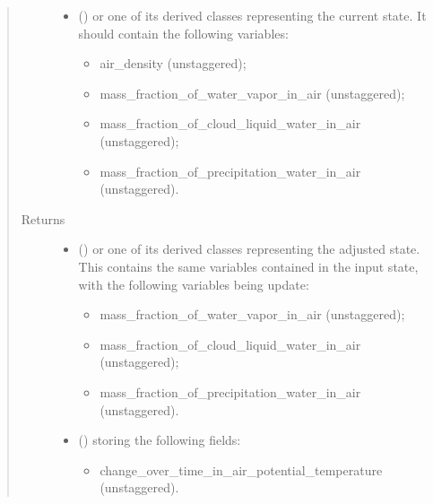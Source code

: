 \documentclass[letterpaper,10pt,english]{sphinxmanual}
\begin{document}
\begin{fulllineitems}
\begin{fulllineitems}
\begin{quote}
\begin{description}
\begin{itemize}
\item {} 
 () \textendash{} 
{\hyperref[\detokenize{api:storages.grid_data.GridData}]{}} or one of its derived classes representing the current state.
It should contain the following variables:
\begin{itemize}
\item {} 
air\_density (unstaggered);

\item {} 
mass\_fraction\_of\_water\_vapor\_in\_air (unstaggered);

\item {} 
mass\_fraction\_of\_cloud\_liquid\_water\_in\_air (unstaggered);

\item {} 
mass\_fraction\_of\_precipitation\_water\_in\_air (unstaggered).

\end{itemize}


\end{itemize}

\item[{Returns}] \leavevmode
\begin{itemize}
\item {} 
 () \textendash{} {\hyperref[\detokenize{api:storages.grid_data.GridData}]{}} or one of its derived classes representing the adjusted state.
This contains the same variables contained in the input state, with the following variables being update:
\begin{itemize}
\item {} 
mass\_fraction\_of\_water\_vapor\_in\_air (unstaggered);

\item {} 
mass\_fraction\_of\_cloud\_liquid\_water\_in\_air (unstaggered);

\item {} 
mass\_fraction\_of\_precipitation\_water\_in\_air (unstaggered).

\end{itemize}

\item {} 
 () \textendash{} {\hyperref[\detokenize{api:storages.grid_data.GridData}]{}} storing the following fields:
\begin{itemize}
\item {} 
change\_over\_time\_in\_air\_potential\_temperature (unstaggered).


\end{itemize}
\end{itemize}
\end{description}
\end{quote}
\end{fulllineitems}
\end{fulllineitems}
\end{document}
